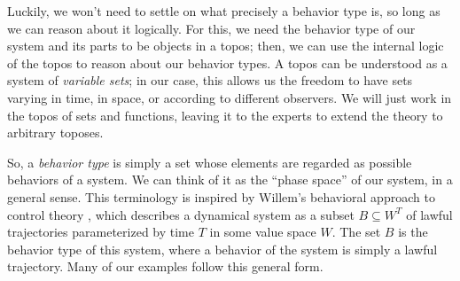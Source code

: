 Luckily, we won't need to settle on what precisely a behavior type is, so long
as we can reason about it logically. For this, we need the behavior type of our
system and its parts to be objects in a topos; then, we can use the internal
logic of the topos to reason about our behavior types. A topos can be understood
as a system of \emph{variable sets}; in our case, this allows us the freedom to
have sets varying in time, in space, or according to different observers. We
will just work in the topos of sets and functions, leaving it to the experts to
extend the theory to arbitrary toposes.

So, a \emph{behavior type} is simply a set whose elements are regarded as possible behaviors of a system.
We can think of it as the ``phase space'' of our system, in a general sense.
This terminology is inspired by Willem's behavioral approach to control theory \cite{Willems.Polderman:2013a}, which
describes a dynamical system as a subset $B \subseteq W^T$ of lawful
trajectories parameterized by time $T$ in some value space $W$. The set $B$ is
the behavior type of this system, where a behavior of the system is simply a
lawful trajectory. Many of our examples follow this general form.




